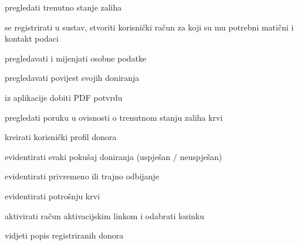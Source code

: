 \documentclass[11pt]{book}
\begin{document}
\begin{packed_enum}
	\item  {}
	
	\begin{packed_enum}
		
		\item pregledati trenutno stanje zaliha
		\item se registrirati u sustav, stvoriti korisnički račun za koji su mu potrebni matični i kontakt podaci
		
	\end{packed_enum}
	
	\item  {}
	
	\begin{packed_enum}
		
		\item pregledavati i mijenjati osobne podatke
		\item pregledavati povijest svojih doniranja
		\item iz aplikacije dobiti PDF potvrdu
		\item pregledati poruku u ovisnosti o trenutnom stanju zaliha krvi
		
	\end{packed_enum}
	
	\item  {}
	
	\begin{packed_enum}
		
		\item kreirati korisnički profil donora
		\item evidentirati svaki pokušaj doniranja (uspješan / neuspješan) 
		\item evidentirati privremeno ili trajno odbijanje
		\item evidentirati potrošnju krvi 
		\item aktivirati račun aktivacijskim linkom i odabrati lozinku
		\item vidjeti popis registriranih donora
		
	\end{packed_enum}
	
	\item  {}
	
	\begin{packed_enum}
		

\end{packed_enum}
\end{packed_enum}
\end{document}
